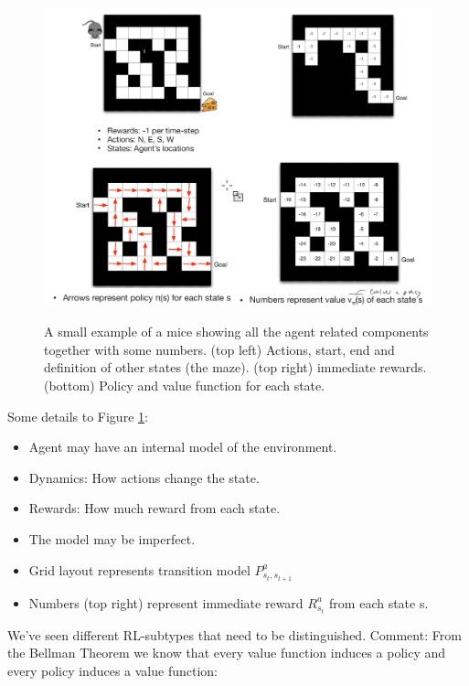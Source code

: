 \documentclass[main]{subfiles}
\begin{document}
\begin{figure}[H]
	\centering
	\includegraphics[width=1\linewidth]{08_ReinforcementLearning/figures/rl-example.png}
	\label{fig:rl-example}
	\caption{A small example of a mice showing all the agent related components together with some numbers. (top left) Actions, start, end and definition of other states (the maze). (top right) immediate rewards. (bottom) Policy and value function for each state.}
\end{figure}

Some details to Figure \cref{fig:rl-example}:
\begin{itemize}
    \item Agent may have an internal model of the environment.
    \item Dynamics: How actions change the state.
    \item Rewards: How much reward from each state.
    \item The model may be imperfect.
    \item Grid layout represents transition model $P_{s_t,s_{t+1}}^a$
    \item Numbers (top right) represent immediate reward $R_{s_t}^a$ from each state s.
\end{itemize}

We've seen different RL-subtypes that need to be distinguished. Comment: From the Bellman Theorem we know that every value function induces a policy and every policy induces a value function:
\end{document}
